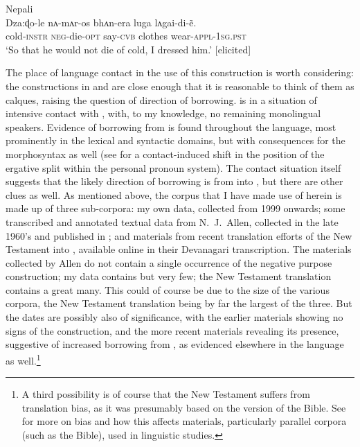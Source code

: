 \documentclass[output=paper,colorlinks,citecolor=brown]{langscibook}
\begin{document}
\ea \label{ex:lah8} \textnormal{Nepali} \\
\gll Dza:ɖo-le nʌ-mʌr-os bhʌn-era luga lʌgai-di-ẽ. \\
cold-\textsc{instr} \textsc{neg}-die-\textsc{opt} say-\textsc{cvb} clothes wear-\textsc{appl-1sg.pst} \\
\glt `So that he would not die of cold, I dressed him.' [elicited]
\z


 The place of language contact in the use of this construction is worth considering: the constructions in  and  are close enough that it is reasonable to think of them as calques, raising the question of direction of borrowing.  is in a situation of intensive contact with , with, to my knowledge, no remaining monolingual speakers. Evidence of borrowing from  is found throughout the language, most prominently in the lexical and syntactic domains, but with consequences for the morphosyntax as well (see \citealt{Lahaussois2003} for a contact-induced shift in the position of the ergative split within the personal pronoun system). The contact situation itself suggests that the likely direction of borrowing is from  into , but there are other clues as well. As mentioned above, the corpus that I have made use of herein is made up of three sub-corpora: my own data, collected from 1999 onwards; some transcribed and annotated textual data from N.\ J.\ Allen, collected in the late 1960's and published in \citet{Allen1975}; and materials from recent translation efforts of the New Testament into , available online in their Devanagari transcription. The materials collected by Allen do not contain a single occurrence of the negative purpose construction; my data contains but very few; the New Testament translation contains a great many. This could of course be due to the size of the various corpora, the New Testament translation being by far the largest of the three. But the dates are possibly also of significance, with the earlier materials showing no signs of the construction, and the more recent materials revealing its presence, suggestive of increased borrowing from , as evidenced elsewhere in the language as well.\footnote{A third possibility is of course that the New Testament suffers from translation bias, as it was presumably based on the  version of the Bible. See \citet{Wälchli2007} for more on bias and how this affects materials, particularly parallel corpora (such as the Bible), used in linguistic studies.}
\end{document}

